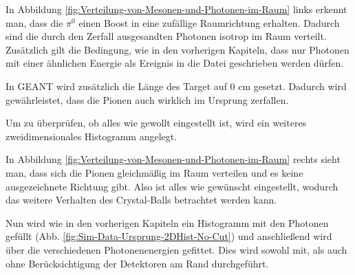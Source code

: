 \documentclass[a4paper,11pt,oneside,final,german,openbib,pdftex]{scrbook}
\begin{document}
{In Abbildung \ref{fig:Verteilung-von-Mesonen-und-Photonen-im-Raum} links erkennt man, dass die $\pi^0$ einen Boost in eine zuf\"allige Raumrichtung erhalten. Dadurch sind die durch den Zerfall ausgesandten Photonen isotrop im Raum verteilt.
Zus\"atzlich gilt die Bedingung, wie in den vorherigen Kapiteln, dass nur Photonen mit einer ähnlichen Energie als Ereignis in die Datei geschrieben werden d\"urfen.

In GEANT wird zus\"atzlich die Länge des Target auf 0 cm gesetzt. Dadurch wird gewährleistet, dass die Pionen auch wirklich im Ursprung zerfallen.




Um zu überprüfen, ob alles wie gewollt eingestellt ist, wird ein weiteres zweidimensionales Histogramm angelegt.



In Abbildung \ref{fig:Verteilung-von-Mesonen-und-Photonen-im-Raum} rechts sieht man, dass sich die Pionen gleichm\"a{\ss}ig im Raum verteilen und es keine ausgezeichnete Richtung gibt. Also ist alles wie gew\"unscht eingestellt, wodurch das weitere Verhalten des Crystal-Balls betrachtet werden kann.

Nun wird wie in den vorherigen Kapiteln ein Histogramm mit den Photonen gefüllt (Abb. \ref{fig:Sim-Data-Ursprung-2DHist-No-Cut}) und anschließend wird über die verschiedenen Photonenenergien gefittet. Dies wird sowohl mit, als auch ohne Berücksichtigung der Detektoren am Rand durchgeführt.

}
\end{document}
